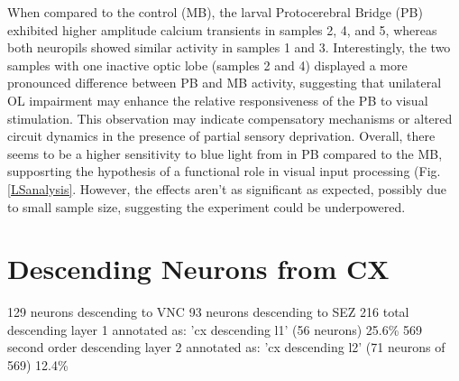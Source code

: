 When compared to the control (MB), the larval Protocerebral Bridge (PB) exhibited higher amplitude calcium transients in samples 2, 4, and 5, whereas both neuropils showed similar activity in samples 1 and 3. Interestingly, the two samples with one inactive optic lobe (samples 2 and 4) displayed a more pronounced difference between PB and MB activity, suggesting that unilateral OL impairment may enhance the relative responsiveness of the PB to visual stimulation. This observation may indicate compensatory mechanisms or altered circuit dynamics in the presence of partial sensory deprivation. 
Overall, there seems to be a higher sensitivity to blue light from in PB compared to the MB, supposrting the hypothesis of a functional role in visual input processing (Fig. \ref{LSanalysis}. However, the effects aren't as significant as expected, possibly due to small sample size, suggesting the experiment could be underpowered.


\section{Descending Neurons from CX}    
                129 neurons descending to VNC
                93 neurons descending to SEZ
                216 total descending
                layer 1 annotated as: 'cx descending l1' (56 neurons) 25.6\%
                569 second order descending
                layer 2 annotated as: 'cx descending l2' (71 neurons of 569) 12.4\%



